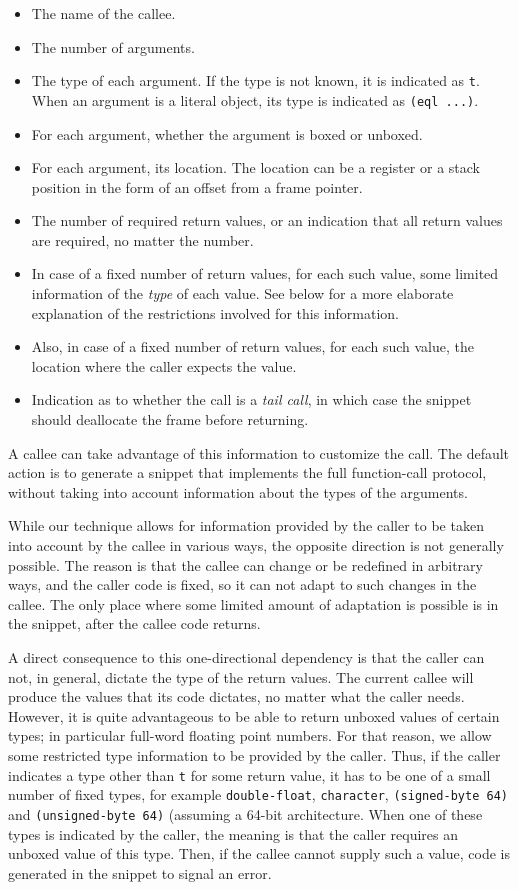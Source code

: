 \begin{itemize}
\item The name of the callee.
\item The number of arguments.
\item The type of each argument.  If the type is not known, it is
  indicated as \texttt{t}.  When an argument is a literal object, its
  type is indicated as \texttt{(eql ...)}.
\item For each argument, whether the argument is boxed or unboxed.
\item For each argument, its location.  The location can be a register
  or a stack position in the form of an offset from a frame pointer.
\item The number of required return values, or an indication that all
  return values are required, no matter the number.
\item In case of a fixed number of return values, for each such value,
  some limited information of the \emph{type} of each value.  See
  below for a more elaborate explanation of the restrictions involved
  for this information.
\item Also, in case of a fixed number of return values, for each such
  value, the location where the caller expects the value.
\item Indication as to whether the call is a \emph{tail call}, in
  which case the snippet should deallocate the frame before
  returning.
\end{itemize}

A callee can take advantage of this information to customize the
call.  The default action is to generate a snippet that implements the
full function-call protocol, without taking into account information
about the types of the arguments.

While our technique allows for information provided by the caller to
be taken into account by the callee in various ways, the opposite
direction is not generally possible.  The reason is that the callee
can change or be redefined in arbitrary ways, and the caller code is
fixed, so it can not adapt to such changes in the callee.  The
only place where some limited amount of adaptation is possible is in
the snippet, after the callee code returns.

A direct consequence to this one-directional dependency is that the
caller can not, in general, dictate the type of the return values.
The current callee will produce the values that its code dictates, no
matter what the caller needs.  However, it is quite advantageous to be
able to return unboxed values of certain types; in particular
full-word floating point numbers.  For that reason, we allow some
restricted type information to be provided by the caller.
Thus, if the caller indicates a type other than \texttt{t} for some
return value, it has to be one of a small number of fixed types, for
example \texttt{double-float}, \texttt{character},
\texttt{(signed-byte 64)} and \texttt{(unsigned-byte 64)} (assuming a
64-bit architecture.  When one of these types is indicated by the
caller, the meaning is that the caller requires an unboxed value of
this type.  Then, if the callee cannot supply such a value, code is
generated in the snippet to signal an error.

